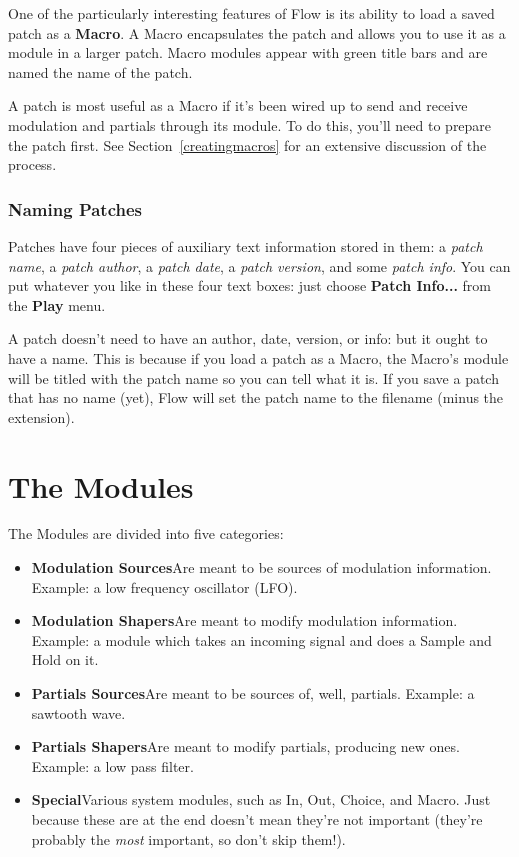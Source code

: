 \documentclass{article}
\newcommand\bump{\vspace{20in}}
\newcommand\name{Flow}
\begin{document}
One of the particularly interesting features of {\name} is its ability to load a saved patch as a {\bf Macro}.  A Macro encapsulates the patch and allows you to use it as a module in a larger patch.  Macro modules appear with green title bars and are named the name of the patch.

A patch is most useful as a Macro if it's been wired up to send and receive modulation and partials through its module.  To do this, you'll need to prepare the patch first.  See Section~\ref{creatingmacros} for an extensive discussion of the process.

\subsubsection{Naming Patches}

Patches have four pieces of auxiliary text information stored in them: a {\it patch name}, a {\it patch author}, a {\it patch date}, a {\it patch version}, and some {\it patch info}.  You can put whatever you like in these four text boxes: just choose {\bf Patch Info...} from the {\bf Play} menu.

A patch doesn't need to have an author, date, version, or info: but it ought to have a name.  This is because if you load a patch as a Macro, the Macro's module will be titled with the patch name so you can tell what it is.  If you save a patch that has no name (yet), {\name} will set the patch name to the filename (minus the extension).

\bump
\section{The Modules}

The Modules are divided into five categories:

\begin{itemize}
\item {\bf Modulation Sources}\quad Are meant to be sources of modulation information.  Example: a low frequency oscillator (LFO).
\item {\bf Modulation Shapers}\quad Are meant to modify modulation information.  Example: a module which takes an incoming signal and does a Sample and Hold on it.
\item {\bf Partials Sources}\quad Are meant to be sources of, well, partials.  Example: a sawtooth wave.
\item {\bf Partials Shapers}\quad Are meant to modify partials, producing new ones.  Example: a low pass filter.
\item {\bf Special}\quad Various system modules, such as In, Out, Choice, and Macro.  Just because these are at the end doesn't mean they're not important (they're probably the {\it most} important, so don't skip them!).
\end{itemize}
\end{document}
